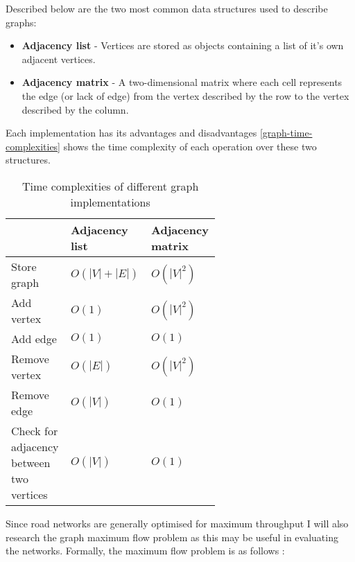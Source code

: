         Described below are the two most common data structures used to describe graphs:

        \begin{itemize}
            \item \textbf{Adjacency list} - Vertices are stored as objects containing a list of it's own adjacent vertices.
            \item \textbf{Adjacency matrix} - A two-dimensional matrix where each cell represents the edge (or lack of edge) from the vertex described by the row to the vertex described by the column.
        \end{itemize}

        Each implementation has its advantages and disadvantages \autoref{graph-time-complexities} shows the time complexity of each operation over these two structures.


        \begin{table}[ht]
            \centering
            \begin{tabular}{|p{0.2\linewidth}|p{0.2\linewidth}|p{0.2\linewidth}|} \hline
            & Adjacency list & Adjacency matrix \\ \hline
            Store graph   & $O(|V|+|E|)$ & $O(|V|^2)$ \\ \hline
            Add vertex    & $O(1)$ & $O(|V|^2)$ \\ \hline
            Add edge      & $O(1)$ & $O(1)$ \\ \hline
            Remove vertex & $O(|E|)$ & $O(|V|^2)$ \\ \hline
            Remove edge   & $O(|V|)$ & $O(1)$ \\ \hline
            Check for adjacency between two vertices & $O(|V|)$ & $O(1)$ \\ \hline
            \end{tabular}
            \caption{Time complexities of different graph implementations \cite{graph-time-complexities}}
            \label{graph-time-complexities}
        \end{table}

        Since road networks are generally optimised for maximum throughput I will also research the graph maximum flow problem as this may be useful in evaluating the networks. Formally, the maximum flow problem is as follows \cite{citation needed}:

